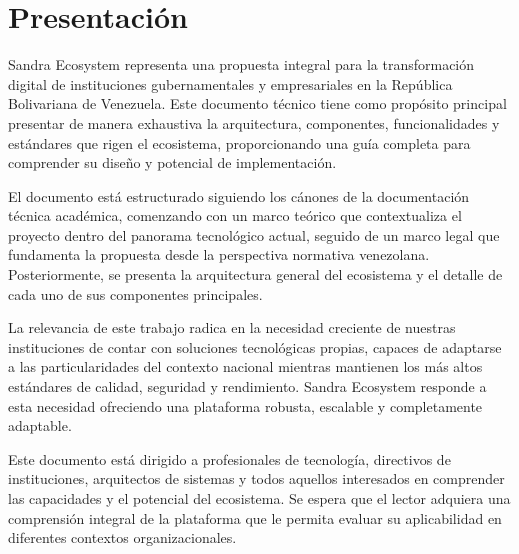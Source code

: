 \chapter*{Presentación}

Sandra Ecosystem representa una propuesta integral para la transformación digital de instituciones gubernamentales y empresariales en la República Bolivariana de Venezuela. Este documento técnico tiene como propósito principal presentar de manera exhaustiva la arquitectura, componentes, funcionalidades y estándares que rigen el ecosistema, proporcionando una guía completa para comprender su diseño y potencial de implementación.

El documento está estructurado siguiendo los cánones de la documentación técnica académica, comenzando con un marco teórico que contextualiza el proyecto dentro del panorama tecnológico actual, seguido de un marco legal que fundamenta la propuesta desde la perspectiva normativa venezolana. Posteriormente, se presenta la arquitectura general del ecosistema y el detalle de cada uno de sus componentes principales.

La relevancia de este trabajo radica en la necesidad creciente de nuestras instituciones de contar con soluciones tecnológicas propias, capaces de adaptarse a las particularidades del contexto nacional mientras mantienen los más altos estándares de calidad, seguridad y rendimiento. Sandra Ecosystem responde a esta necesidad ofreciendo una plataforma robusta, escalable y completamente adaptable.

Este documento está dirigido a profesionales de tecnología, directivos de instituciones, arquitectos de sistemas y todos aquellos interesados en comprender las capacidades y el potencial del ecosistema. Se espera que el lector adquiera una comprensión integral de la plataforma que le permita evaluar su aplicabilidad en diferentes contextos organizacionales.

\newpage
